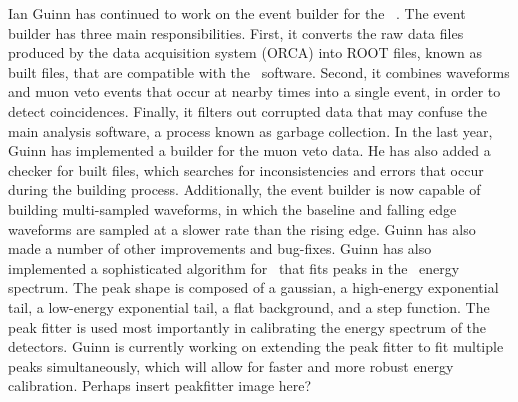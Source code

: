 Ian Guinn has continued to work on the event builder for the \MJ\ \MJDemo. The event builder has three main responsibilities. First, it converts the raw data files produced by the data acquisition system (ORCA) into ROOT files, known as built files, that are compatible with the \MJ\ software. Second, it combines waveforms and muon veto events that occur at nearby times into a single event, in order to detect coincidences. Finally, it filters out corrupted data that may confuse the main analysis software, a process known as garbage collection. In the last year, Guinn has implemented a builder for the muon veto data. He has also added a checker for built files, which searches for inconsistencies and errors that occur during the building process. Additionally, the event builder is now capable of building multi-sampled waveforms, in which the baseline and falling edge waveforms are sampled at a slower rate than the rising edge. Guinn has also made a number of other improvements and bug-fixes.\newline
\indent Guinn has also implemented a sophisticated algorithm for \MJ\ that fits peaks in the \MJDemo\ energy spectrum. The peak shape is composed of a gaussian, a high-energy exponential tail, a low-energy exponential tail, a flat background, and a step function. The peak fitter is used most importantly in calibrating the energy spectrum of the detectors. Guinn is currently working on extending the peak fitter to fit multiple peaks simultaneously, which will allow for faster and more robust energy calibration. Perhaps insert peakfitter image here?
%
%
%
%
%
%
%
%
%
%
%


